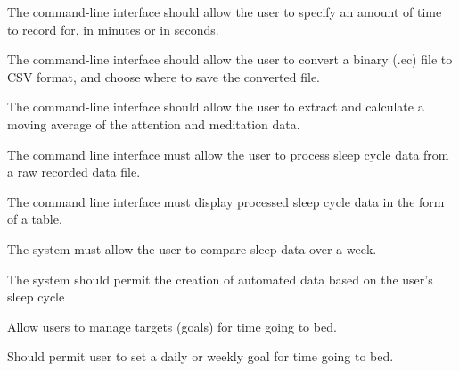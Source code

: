 \begin{reqtable}
  {The command-line interface should allow the user to specify an amount of time to record for, in
    minutes or in seconds.}
  \phigh
  \deps{\ref{sreq:allow-user-record-data}}

  {The command-line interface should allow the user to convert a binary (.ec) file to CSV format,
    and choose where to save the converted file.}
  \phigh
  \deps{\ref{sreq:facilitate-conversion}}

  {The command-line interface should allow the user to extract and calculate a moving average of the
    attention and meditation data.}
  \phigh
  \deps{\ref{sreq:calculate-moving-average}}

  {The command line interface must allow the user to process sleep cycle data from a raw recorded
    data file.}
  \phigh
  \deps{\ref{sreq:extract-sleep-percentage}}

  {The command line interface must display processed sleep cycle data in the form of a table.}
  \phigh
  \deps{\ref{req:apply-sorting-algorithm}}


  \reqheader

  {The system must allow the user to compare sleep data over a week.}
  \phigh
  \deps{\ref{req:store-data}, \ref{req:manual-entry}}

  {The system should permit the creation of automated data based on the user's sleep cycle}
  \pmed
  \deps{\ref{req:store-data}}


  \reqheader

  {Allow users to manage targets (goals) for time going to bed.}
  \pmed
  \deps{\ref{req:store-data}, \ref{req:manual-entry}}

  {Should permit user to set a daily or weekly goal for time going to bed.}
  \pmed
  \dnone


\end{reqtable}
